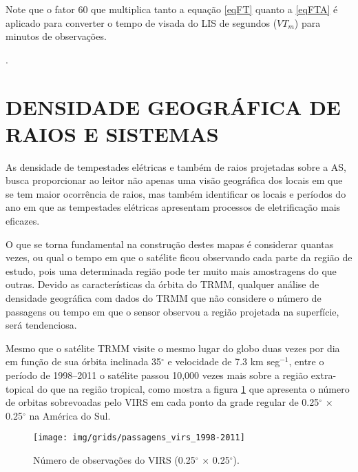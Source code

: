 

Note que o fator 60 que multiplica tanto a equação \ref{eqFT} quanto a \ref{eqFTA} é aplicado para converter o tempo de visada do LIS de segundos ($VT_m$) para minutos de observações.


 .


\section{DENSIDADE GEOGRÁFICA DE RAIOS E SISTEMAS}
\label{metodoPass}


As densidade de tempestades elétricas e também de raios projetadas sobre a AS, busca proporcionar ao leitor não apenas uma visão geográfica dos locais em que se tem maior ocorrência de raios, mas também identificar os locais e períodos do ano em que as tempestades elétricas apresentam processos de eletrificação mais eficazes.  


O que se torna fundamental na construção destes mapas é considerar quantas vezes, ou qual o tempo em que o satélite ficou observando cada parte da região de estudo, pois uma determinada região pode ter muito mais amostragens do que outras. Devido as características da órbita do TRMM, qualquer análise de densidade geográfica com dados do TRMM que não considere o número de passagens ou tempo em que o sensor observou a região projetada na superfície, será tendenciosa.

Mesmo que o satélite TRMM visite o mesmo lugar do globo duas vezes por dia em função de sua órbita inclinada 35$^{\circ}$ e velocidade de 7.3 km seg$^{-1}$, entre o período de 1998--2011 o satélite passou 10,000 vezes mais sobre a região extra-topical do que na região tropical, como mostra a figura \ref{VirsVT} que apresenta o número de orbitas sobrevoadas pelo VIRS em cada ponto da grade regular de 0.25$^{\circ}$  $\times$ 0.25$^{\circ}$ na América do Sul.

\begin{figure}[!hb]
  \centering
  {{\texttt{[image: img/grids/passagens\_virs\_1998-2011]}}}
\caption{Número de observações do VIRS (0.25$^{\circ}$  $\times$ 0.25$^{\circ}$).}
\label{VirsVT}
\end{figure} 

